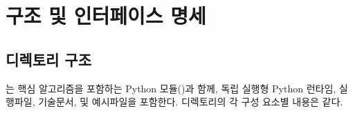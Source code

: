 \part{구조 및 인터페이스 명세}
\label{part:ioref}


\chapter{디렉토리 구조}
\simulator 는 핵심 알고리즘을 포함하는 Python 모듈(\pymodule)과 함께, 독립 실행형 Python 런타임, 실행파일, 기술문서, 및 예시파일을 포함한다.
디렉토리의 각 구성 요소별 내용은 \과 같다.

